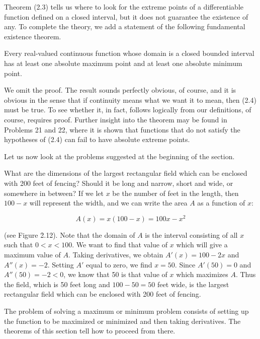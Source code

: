 Theorem (2.3) tells us where to look for the extreme points of a differentiable function defined on a closed interval, but it does not guarantee the existence of any. To complete the theory, we add a statement of the following fundamental existence theorem.

\begin{prop} %
\label{thm 2.2.4}
Every real-valued continuous function whose domain is a closed bounded interval has at least one absolute maximum point and at least one absolute minimum point.
\end{prop}

We omit the proof. The result sounds perfectly obvious, of course, and it is obvious in the sense that if continuity means what we want it to mean, then (2.4) must be true. To see whether it, in fact, follows logically from our definitions, of course, requires proof. Further insight into the theorem may be found in Problems 21 and 22, where it is shown that functions that do not satisfy the hypotheses of (2.4) can fail to have absolute extreme points.

Let us now look at the problems suggested at the beginning of the section.
\medskip

\begin{example}
\label{exam 2.2.1}
What are the dimensions of the largest rectangular field which can be enclosed with 200 feet of fencing? Should it be long and narrow, short and wide, or somewhere in between? If we let $x$ be the number of feet in the length, then $100-x$ will represent the width, and we can write the area $A$ as a function of $x$:

$$
A(x) = x(100 - x) = 100x - x^2
$$ 


\noindent (see Figure \f{2.12}). Note that the domain of $A$ is the interval consisting of all $x$
such that $0 < x < 100$. We want to find that value of $x$ which will give a maximum value of $A$. Taking derivatives, we obtain $A'(x)= 100 - 2x$ and $A''(x)= -2$. Setting $A'$ equal to zero, we find $x= 50$. Since $A'(50) = 0$ and $A''(50) = -2 < 0$, we know that 50 is that value of $x$ which maximizes $A$. Thus the field, which is 50 feet long and $100 - 50 = 50$ feet wide, is the largest rectangular field which can be enclosed with 200 feet of fencing.
\end{example}
\medskip

The problem of solving a maximum or minimum problem consists of setting up the function to be maximized or minimized and then taking derivatives. The theorems of this section tell how to proceed from there.

